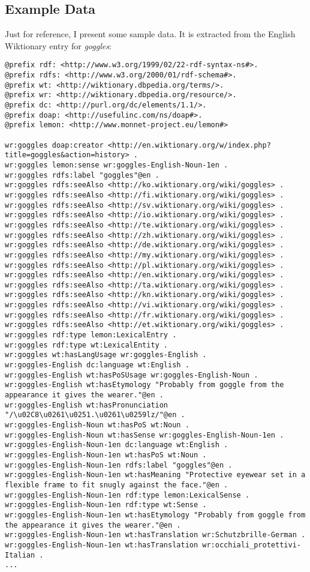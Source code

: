 \subsection{Example Data}
Just for reference, I present some sample data. It is extracted from the English Wiktionary entry for \textit{goggles}:
\begin{lstlisting}[style=N3]
@prefix rdf: <http://www.w3.org/1999/02/22-rdf-syntax-ns#>.
@prefix rdfs: <http://www.w3.org/2000/01/rdf-schema#>.
@prefix wt: <http://wiktionary.dbpedia.org/terms/>.
@prefix wr: <http://wiktionary.dbpedia.org/resource/>.
@prefix dc: <http://purl.org/dc/elements/1.1/>.
@prefix doap: <http://usefulinc.com/ns/doap#>.
@prefix lemon: <http://www.monnet-project.eu/lemon#>

wr:goggles doap:creator <http://en.wiktionary.org/w/index.php?title=goggles&action=history> . 
wr:goggles lemon:sense wr:goggles-English-Noun-1en . 
wr:goggles rdfs:label "goggles"@en . 
wr:goggles rdfs:seeAlso <http://ko.wiktionary.org/wiki/goggles> . 
wr:goggles rdfs:seeAlso <http://fi.wiktionary.org/wiki/goggles> . 
wr:goggles rdfs:seeAlso <http://sv.wiktionary.org/wiki/goggles> . 
wr:goggles rdfs:seeAlso <http://io.wiktionary.org/wiki/goggles> . 
wr:goggles rdfs:seeAlso <http://te.wiktionary.org/wiki/goggles> . 
wr:goggles rdfs:seeAlso <http://zh.wiktionary.org/wiki/goggles> . 
wr:goggles rdfs:seeAlso <http://de.wiktionary.org/wiki/goggles> . 
wr:goggles rdfs:seeAlso <http://my.wiktionary.org/wiki/goggles> . 
wr:goggles rdfs:seeAlso <http://pl.wiktionary.org/wiki/goggles> . 
wr:goggles rdfs:seeAlso <http://en.wiktionary.org/wiki/goggles> . 
wr:goggles rdfs:seeAlso <http://ta.wiktionary.org/wiki/goggles> . 
wr:goggles rdfs:seeAlso <http://kn.wiktionary.org/wiki/goggles> . 
wr:goggles rdfs:seeAlso <http://vi.wiktionary.org/wiki/goggles> . 
wr:goggles rdfs:seeAlso <http://fr.wiktionary.org/wiki/goggles> . 
wr:goggles rdfs:seeAlso <http://et.wiktionary.org/wiki/goggles> . 
wr:goggles rdf:type lemon:LexicalEntry . 
wr:goggles rdf:type wt:LexicalEntity . 
wr:goggles wt:hasLangUsage wr:goggles-English . 
wr:goggles-English dc:language wt:English . 
wr:goggles-English wt:hasPoSUsage wr:goggles-English-Noun . 
wr:goggles-English wt:hasEtymology "Probably from goggle from the appearance it gives the wearer."@en . 
wr:goggles-English wt:hasPronunciation "/\u02C8\u0261\u0251.\u0261\u0259lz/"@en . 
wr:goggles-English-Noun wt:hasPoS wt:Noun . 
wr:goggles-English-Noun wt:hasSense wr:goggles-English-Noun-1en . 
wr:goggles-English-Noun-1en dc:language wt:English . 
wr:goggles-English-Noun-1en wt:hasPoS wt:Noun . 
wr:goggles-English-Noun-1en rdfs:label "goggles"@en . 
wr:goggles-English-Noun-1en wt:hasMeaning "Protective eyewear set in a flexible frame to fit snugly against the face."@en . 
wr:goggles-English-Noun-1en rdf:type lemon:LexicalSense . 
wr:goggles-English-Noun-1en rdf:type wt:Sense . 
wr:goggles-English-Noun-1en wt:hasEtymology "Probably from goggle from the appearance it gives the wearer."@en . 
wr:goggles-English-Noun-1en wt:hasTranslation wr:Schutzbrille-German . 
wr:goggles-English-Noun-1en wt:hasTranslation wr:occhiali_protettivi-Italian . 
...
\end{lstlisting}

